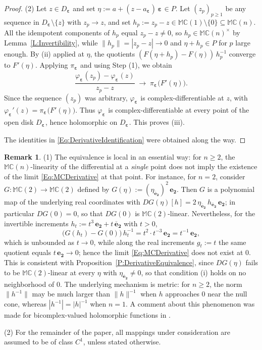 \documentclass[12pt]{amsart}
\theoremstyle{plain}
\theoremstyle{definition}
\newtheorem*{remark}{Remark}
\numberwithin{equation}{section}
\newcommand{\be}[1]{\mathbf{e_{#1}}}
\newcommand{\bec}[1]{\mathbf{\overline{e}_{#1}}}
\newcommand{\bep}[1]{\bm{\varepsilon_{#1}}}
\newcommand{\mC}{\mathbb{C}}
\newcommand{\mM}{\mathbb{M}}
\newcommand{\ra}{\rightarrow}
\begin{document}
\begin{proof}
    (2) Let $z \in D_{\bep{}}$
    and set $\eta := a + ( z - a_{\bep{}} )\, \bep{} \in P$. Let $( z_p )_{p \geq 1}$
    be any sequence in $D_{\bep{}} \setminus \{ z \}$ with $z_p \ra z$, and set
    $h_p := z_p - z \in \mM \mC(1) \setminus \{ 0 \} \subseteq \mM \mC (n)$. All the idempotent
    components of $h_p$ equal $z_p - z \neq 0$, so
    $h_p \in \mM \mC(n)^\times$ by Lemma~\ref{L:Invertibility}, while
    $\| h_p \| = | z_p - z | \ra 0$ and $\eta + h_p \in P$ for $p$ large
    enough. By (ii) applied at $\eta$, the quotients
    $( F ( \eta + h_p ) - F ( \eta ) )\, h_p^{-1}$ converge to $F ' (\eta )$. Applying $\pi_{\bep{}}$ and using Step (1), we obtain
        \[
        \frac{ \varphi_{\bep{}} ( z_p ) - \varphi_{\bep{}} ( z ) }{ z_p - z }
        \; \longrightarrow \; \pi_{\bep{}} \big( F ' ( \eta ) \big).
        \]
    Since the sequence $( z_p )$ was arbitrary, $\varphi_{\bep{}}$ is
    complex-differentiable at $z$, with
    $\varphi_{\bep{}} ' ( z ) = \pi_{\bep{}} \big( F ' ( \eta ) \big)$. Thus $\varphi_{\bep{}}$ is
    complex-differentiable at every point of the open disk $D_{\bep{}}$, hence
    holomorphic on $D_{\bep{}}$. This proves (iii).
    
    The identities in \eqref{Eq:DerivativeIdentification} were
    obtained along the way.
    \end{proof}

    \begin{remark}
    (1) The equivalence is local in an essential way: for $n \geq 2$, the $\mM \mC(n)$-linearity of the differential at a \emph{single} point does not imply the existence of the limit \eqref{Eq:MCDerivative} at that point. For instance, for $n = 2$, consider $G : \mM \mC(2) \ra \mM \mC(2)$ defined by $G (\eta ) := ( \eta_{\bec{2}} )^2\, \be{2}$. Then $G$ is a polynomial map of the underlying real coordinates with $DG (\eta ) [ h ] = 2\, \eta_{\bec{2}}\, h_{\bec{2}}\, \be{2}$; in
    particular $DG ( 0 ) = 0$, so that $DG ( 0 )$ is $\mM \mC(2)$-linear. Nevertheless, for the invertible increments
    $h_t := t^3\, \be{2} + t\, \bec{2}$ with $t > 0$,
        \[
        \big( G ( h_t ) - G ( 0 ) \big)\, h_t^{-1}
        = t^2 \cdot t^{-3}\, \be{2} = t^{-1}\, \be{2} ,
        \]
    which is unbounded as $t \ra 0$, while along the real increments $g_t := t$ the same quotient equals $t\, \be{2} \ra 0$; hence the limit \eqref{Eq:MCDerivative} does not exist at $0$. This is consistent with Proposition~\ref{P:DerivativeEquivalence}, since $DG (\eta )$ fails to be $\mM \mC(2)$-linear at every $\eta$ with $\eta_{\bec{2}} \neq 0$, so that condition (i) holds on no neighborhood of $0$. The underlying mechanism is metric: for $n \geq 2$, the norm $\| h^{-1} \|$ may be much larger than $\| h \|^{-1}$ when $h$ approaches $0$ near the null cone, whereas $| h^{-1} | = | h |^{-1}$ when $n = 1$. A comment about this phenomenon was made for bicomplex-valued holomorphic functions in \cite{Bicomplex}.
    
    (2) For the remainder of the paper, all mappings under consideration are assumed to be of class $C^1$, unless stated otherwise.
    \end{remark}
\end{document}
